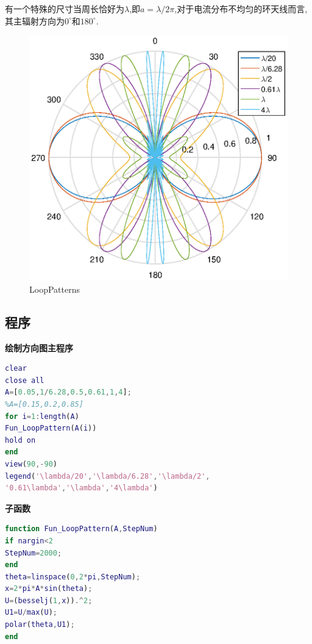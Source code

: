 有一个特殊的尺寸当周长恰好为$\lambda$,即$a=\lambda/2\pi$,对于电流分布不均匀的环天线而言,其主辐射方向为$0^\circ $和$180^\circ $.
\begin{figure}[!ht]
	\centering
	\includegraphics[width=12cm]{loop_all.eps}
	\caption{LoopPatterns} \label{fig:loopall}
\end{figure}

\subsection{程序}
\noindent \textbf{绘制方向图主程序}
\begin{lstlisting}[language={matlab},keywordstyle=\color{blue!70},commentstyle=\color{red!50!green!50!blue!50},frame=shadowbox, rulesepcolor=\color{red!20!green!20!blue!20}] 
%主程序
clear
close all
A=[0.05,1/6.28,0.5,0.61,1,4];
%A=[0.15,0.2,0.85]
for i=1:length(A)
Fun_LoopPattern(A(i))
hold on
end
view(90,-90)
legend('\lambda/20','\lambda/6.28','\lambda/2',
'0.61\lambda','\lambda','4\lambda')
\end{lstlisting}
\noindent \textbf{子函数}
\begin{lstlisting}[language={matlab},keywordstyle=\color{blue!70},commentstyle=\color{red!50!green!50!blue!50},frame=shadowbox, rulesepcolor=\color{red!20!green!20!blue!20}] 
%子函数
function Fun_LoopPattern(A,StepNum)
if nargin<2
StepNum=2000;
end
theta=linspace(0,2*pi,StepNum);
x=2*pi*A*sin(theta);
U=(besselj(1,x)).^2;
U1=U/max(U);
polar(theta,U1);
end

\end{lstlisting}
